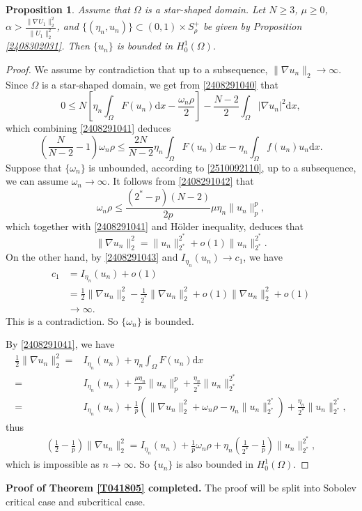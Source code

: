 \documentclass[10pt]{article}
\numberwithin{equation}{section}
\newtheorem{proposition}[theorem]{Proposition}
\newcommand{\ud}{\mathrm{d}}
\numberwithin{equation}{section}
\begin{document}
\begin{proposition}\label{2505231848}
 Assume that $\Omega$ is a star-shaped domain. Let $N\geq 3$, $\mu\ge 0$, $\alpha>\frac{\|\nabla U_1\|_2^2}{\|U_1\|_2^2}$, and $\{(\eta_n, u_n)\}\subset (0, 1)\times S_\rho^+$ be given by Proposition \ref{2408302031}.
Then $\{u_n\}$ is bounded in $H_0^1(\Omega)$.
\end{proposition}
\begin{proof}
We assume by contradiction that up to a subsequence, $\|\nabla u_n\|_2\to \infty$. Since $\Omega$ is a star-shaped domain, we get from \eqref{2408291040} that
\begin{equation*}
0\le N\left[\eta_n\int_{\Omega}F(u_n)\ud x-\frac{\omega_n\rho}{2}\right]-\frac{N-2}{2}\int_{\Omega}|\nabla u_n|^2 \ud x,
\end{equation*}
which combining \eqref{2408291041} deduces
\begin{equation}\label{2408291042}
\left(\frac{N}{N-2}-1\right)\omega_n\rho\le \frac{2N}{N-2}\eta_n\int_{\Omega}F(u_n)\ud x-\eta_n\int_{\Omega}f(u_n)u_n \ud x.
\end{equation}
Suppose that $\{\omega_n\}$ is unbounded, according to \eqref{2510092110}, up to a subsequence, we can assume $\omega_n\to\infty$.  It follows from \eqref{2408291042} that
\[
\omega_n\rho\le \frac{(2^*-p)(N-2)}{2p}\mu\eta_n\|u_n\|_{p}^{p},
\]
which together with \eqref{2408291041} and H\"older inequality, deduces that
\begin{equation}\label{2408291043}
\|\nabla u_n\|_2^2=\|u_n\|_{2^*}^{2^*}+o(1)\|u_n\|_{2^*}^{2^*}.
\end{equation}
On the other hand, by \eqref{2408291043} and $I_{\eta_n}(u_n)\to c_1$, we have
\[
\begin{aligned}
c_1&=I_{\eta_n}(u_n)+o(1)\\
&=\frac{1}{2}\|\nabla u_n\|_2^2-\frac{1}{2^*}\|\nabla u_n\|_2^2+o(1)\|\nabla u_n\|_2^2+o(1)\\
&\to \infty.
\end{aligned}
\]
This is a contradiction. So $\{\omega_n\}$ is bounded. 

By \eqref{2408291041}, we have
\[
\begin{aligned}
\frac{1}{2}\|\nabla u_n\|^2_{2}=&I_{\eta_n}(u_n)
+\eta_n\int_{\Omega}F(u_n) \ud x\\
=&I_{\eta_n}(u_n)+\frac{\mu\eta_n}{p}\|u_n\|_p^p+\frac{\eta_n}{2^*}\|u_n\|_{2^*}^{2^*}\\
=&I_{\eta_n}(u_n)+\frac{1}{p}\left(\|\nabla u_n\|^2_{2}+\omega_n\rho
-\eta_n\|u_n\|_{2^*}^{2^*}\right)
+\frac{\eta_n}{2^*}\|u_n\|_{2^*}^{2^*},
\end{aligned}
\]
thus
\[
\begin{aligned}
\left(\frac{1}{2}-\frac{1}{p}\right)\|\nabla u_n\|^2_{2}
=I_{\eta_n}(u_n)+\frac{1}{p}\omega_n\rho
+\eta_n\left(\frac{1}{2^*}-\frac{1}{p}\right)\|u_n\|_{2^*}^{2^*},
\end{aligned}
\]
which is impossible as $n\rightarrow\infty$. So $\{u_n\}$ is also bounded in $H_0^1(\Omega)$.
\end{proof}
\noindent
{\bf Proof of Theorem \ref{T041805} completed.} The proof will be split into Sobolev critical case and subcritical case.
\end{document}

